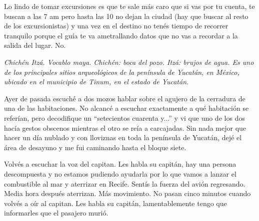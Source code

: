 \documentclass[12pt,twoside,openright,a5paper]{book}
\begin{document}
Lo lindo de tomar excursiones es que te sale más caro que si vas por tu
cuenta, te buscan a las 7 am pero hasta las 10 no dejan la ciudad (hay que
buscar al resto de los excursionistas) y una vez en el destino no tenés
tiempo de recorrer tranquilo porque el guía te va ametrallando datos que
no vas a recordar a la salida del lugar. No.


\vspace{0.5cm}
\hrulefill\hspace{0.2cm} \decofourleft\decofourright \hspace{0.2cm} \hrulefill
\vspace{0.5cm}

\emph{Chichén Itzá. Vocablo maya. Chichén: boca del pozo. Itzá: brujos de agua.
Es uno de los principales sitios arqueológicos de la península de Yucatán,
en México, ubicado en el municipio de Tinum, en el estado de Yucatán.}


\vspace{0.5cm}
\hrulefill\hspace{0.2cm} \decofourleft\decofourright \hspace{0.2cm} \hrulefill
\vspace{0.5cm}

Ayer de pasada escuché a dos mozos hablar sobre el agujero de la cerradura de
una de las habitaciones. No alcancé a escuchar exactamente a qué habitación
se referían, pero decodifique un “setecientos cuarenta y...” y vi que uno
de los dos hacía gestos obscenos mientras el otro se reía a carcajadas. Sin
nada mejor que hacer un día nublado y con lloviznas en toda la península de
Yucatán, dejé el área de desayuno y me fui caminando hasta el bloque siete.


\vspace{0.5cm}
\hrulefill\hspace{0.2cm} \decofourleft\decofourright \hspace{0.2cm} \hrulefill
\vspace{0.5cm}

Volvés a escuchar la voz del capitan. Les habla su capitán, hay una
persona descompuesta y no estamos pudiendo ayudarla por lo que vamos a
lanzar el combustible al mar y aterrizar en Recife. Sentís la fuerza del
avión regresando. Media hora después aterrizan. Más movimiento. No pasan
cinco minutos cuando volvés a oír al capitan. Les habla su capitán,
lamentablemente tengo que informarles que el pasajero murió.


\vspace{0.5cm}
\hrulefill\hspace{0.2cm} \decofourleft\decofourright \hspace{0.2cm} \hrulefill
\vspace{0.5cm}
\end{document}
